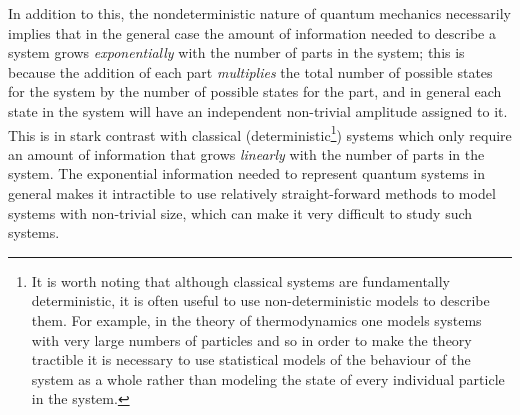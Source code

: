 \documentclass{amsbook}
\theoremstyle{plain}
\theoremstyle{definition}
\theoremstyle{remark}
\begin{document}
In addition to this, the nondeterministic nature of quantum mechanics necessarily implies that in the general case the amount of information needed to describe a system grows \emph{exponentially} with the number of parts in the system;  this is because the addition of each part \emph{multiplies} the total number of possible states for the system by the number of possible states for the part, and in general each state in the system will have an independent non-trivial amplitude assigned to it.  This is in stark contrast with classical (deterministic\footnote{It is worth noting that although classical systems are fundamentally deterministic, it is often useful to use non-deterministic models to describe them.  For example, in the theory of thermodynamics one models systems with very large numbers of particles and so in order to make the theory tractible it is necessary to use statistical models of the behaviour of the system as a whole rather than modeling the state of every individual particle in the system.}) systems which only require an amount of information that grows \emph{linearly} with the number of parts in the system.  The exponential information needed to represent quantum systems in general makes it intractible to use relatively straight-forward methods to model systems with non-trivial size, which can make it very difficult to study such systems.
\end{document}
